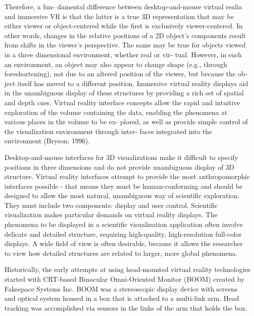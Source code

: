 Therefore, a fun- damental difference between desktop-and-mouse virtual realia and immersive VR is that the latter is a true 3D representation that may be either viewer or object-centered while the first is exclusively viewer-centered. In other words, changes in the relative positions of a 2D object’s components result from shifts in the viewer’s perspective. The same may be true for objects viewed in a three dimensional environment, whether real or vir- tual. However, in such an environment, an object may also appear to change shape (e.g., through foreshortening), not due to an altered position of the viewer, but because the ob- ject itself has moved to a different position. Immersive virtual reality displays aid in the unambiguous display of these structures by providing a rich set of spatial and depth cues. Virtual reality interface concepts allow the rapid and intuitive exploration of the volume containing the data, enabling the phenomena at various places in the volume to be ex- plored, as well as provide simple control of the visualization environment through inter- faces integrated into the environment (Bryson; 1996).

Desktop-and-mouse interfaces for 3D visualizations make it difficult to specify positions in three dimensions and do not provide unambiguous display of 3D structure. Virtual reality interfaces attempt to provide the most anthropomorphic interfaces possible - that means they must be human-conforming and should be designed to allow the most natural, unambiguous way of scientific exploration. They must include two components: display and user control. Scientific visualization makes particular demands on virtual reality displays. The phenomena to be displayed in a scientific visualization application often involve delicate and detailed structure, requiring high-quality, high-resolution full-color displays. A wide field of view is often desirable, because it allows the researcher to view how detailed structures are related to larger, more global phenomena.

Historically, the early attempts at using head-mounted virtual reality technologies started with CRT-based Binocular Omni-Oriented Monitor (BOOM) created by Fakespace Systems Inc. BOOM was a stereoscopic display device with screens and optical system housed in a box that is attached to a multi-link arm. Head tracking was accomplished via sensors in the links of the arm that holds the box.


